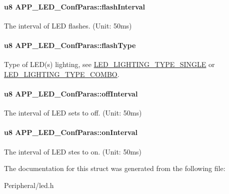 \paragraph[{\texorpdfstring{flash\+Interval}{flashInterval}}]{\setlength{\rightskip}{0pt plus 5cm}u8 A\+P\+P\+\_\+\+L\+E\+D\+\_\+\+Conf\+Paras\+::flash\+Interval}\hypertarget{struct_a_p_p___l_e_d___conf_paras_a3334105f4c42cf49221b5b83f20d1f3e}{}\label{struct_a_p_p___l_e_d___conf_paras_a3334105f4c42cf49221b5b83f20d1f3e}
The interval of L\+ED flashes. (Unit\+: 50ms) 
\paragraph[{\texorpdfstring{flash\+Type}{flashType}}]{\setlength{\rightskip}{0pt plus 5cm}u8 A\+P\+P\+\_\+\+L\+E\+D\+\_\+\+Conf\+Paras\+::flash\+Type}\hypertarget{struct_a_p_p___l_e_d___conf_paras_a4e95d202a824c4d57db42c0ac9c7aaf1}{}\label{struct_a_p_p___l_e_d___conf_paras_a4e95d202a824c4d57db42c0ac9c7aaf1}
Type of L\+E\+D(s) lighting, see \hyperlink{group___l_e_d___l_i_g_h_t_i_n_g___t_y_p_e___s_i_n_g_l_e}{L\+E\+D\+\_\+\+L\+I\+G\+H\+T\+I\+N\+G\+\_\+\+T\+Y\+P\+E\+\_\+\+S\+I\+N\+G\+LE} or \hyperlink{group___l_e_d___l_i_g_h_t_i_n_g___t_y_p_e___c_o_m_b_o}{L\+E\+D\+\_\+\+L\+I\+G\+H\+T\+I\+N\+G\+\_\+\+T\+Y\+P\+E\+\_\+\+C\+O\+M\+BO}. 
\paragraph[{\texorpdfstring{off\+Interval}{offInterval}}]{\setlength{\rightskip}{0pt plus 5cm}u8 A\+P\+P\+\_\+\+L\+E\+D\+\_\+\+Conf\+Paras\+::off\+Interval}\hypertarget{struct_a_p_p___l_e_d___conf_paras_aa797a5e703f950b1109945d2cc9c3c6e}{}\label{struct_a_p_p___l_e_d___conf_paras_aa797a5e703f950b1109945d2cc9c3c6e}
The interval of L\+ED sets to off. (Unit\+: 50ms) 
\paragraph[{\texorpdfstring{on\+Interval}{onInterval}}]{\setlength{\rightskip}{0pt plus 5cm}u8 A\+P\+P\+\_\+\+L\+E\+D\+\_\+\+Conf\+Paras\+::on\+Interval}\hypertarget{struct_a_p_p___l_e_d___conf_paras_a95ef3af47fa872313c97ba562f7ce47b}{}\label{struct_a_p_p___l_e_d___conf_paras_a95ef3af47fa872313c97ba562f7ce47b}
The interval of L\+ED stes to on. (Unit\+: 50ms) 

The documentation for this struct was generated from the following file\+:\begin{DoxyCompactItemize}
\item 
Peripheral/led.\+h\end{DoxyCompactItemize}
